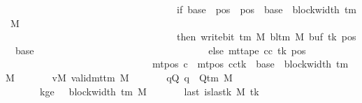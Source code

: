 \begin{isabellebody}
\ \ \ \ \ \ \ \ \ \ \ \ \ \ \ \ \ \ \ \ \ \ \ \ \ \ \ \ \ \ \ \ \ \ \ if\ base{\isacharprime}{\kern0pt}\ {\isasymle}\ pos\ {\isasymand}\ pos\ {\isacharless}{\kern0pt}\ base{\isacharprime}{\kern0pt}\ {\isacharplus}{\kern0pt}\ block{\isacharunderscore}{\kern0pt}width\ {\isacharparenleft}{\kern0pt}{\isasymGamma}{\isacharunderscore}{\kern0pt}tm\ M{\isacharparenright}{\kern0pt}\isanewline
\ \ \ \ \ \ \ \ \ \ \ \ \ \ \ \ \ \ \ \ \ \ \ \ \ \ \ \ \ \ \ \ \ \ \ then\ write{\isacharunderscore}{\kern0pt}bit\ {\isacharparenleft}{\kern0pt}{\isasymGamma}{\isacharunderscore}{\kern0pt}tm\ M{\isacharparenright}{\kern0pt}\ {\isacharparenleft}{\kern0pt}bl{\isacharunderscore}{\kern0pt}tm\ M{\isacharparenright}{\kern0pt}\ {\isacharparenleft}{\kern0pt}buf\ tk{\isacharparenright}{\kern0pt}\ {\isacharparenleft}{\kern0pt}pos\ {\isacharminus}{\kern0pt}\ base{\isacharprime}{\kern0pt}{\isacharparenright}{\kern0pt}\isanewline
\ \ \ \ \ \ \ \ \ \ \ \ \ \ \ \ \ \ \ \ \ \ \ \ \ \ \ \ \ \ \ \ \ \ \ else\ mt{\isacharunderscore}{\kern0pt}tape\ cc\ tk\ pos{\isacharparenright}{\kern0pt}{\isacharparenright}{\kern0pt}\isanewline
\ \ \ \ \ \ \ \ \ \ \ \ \ \ \ \ \ \ \ \ \ \ \ \ \ \ \ \ \ {\isasymand}\ mt{\isacharunderscore}{\kern0pt}pos\ c{\isacharprime}{\kern0pt}{\isacharprime}{\kern0pt}\ {\isacharequal}{\kern0pt}\ {\isacharparenleft}{\kern0pt}mt{\isacharunderscore}{\kern0pt}pos\ cc{\isacharparenright}{\kern0pt}{\isacharparenleft}{\kern0pt}tk\ {\isacharcolon}{\kern0pt}{\isacharequal}{\kern0pt}\ base{\isacharprime}{\kern0pt}\ {\isacharplus}{\kern0pt}\ block{\isacharunderscore}{\kern0pt}width\ {\isacharparenleft}{\kern0pt}{\isasymGamma}{\isacharunderscore}{\kern0pt}tm\ M{\isacharparenright}{\kern0pt}{\isacharparenright}{\kern0pt}{\isachardoublequoteclose}\isanewline
\ \ \ \ \ \ \ vM{\isacharcolon}{\kern0pt}\ {\isachardoublequoteopen}valid{\isacharunderscore}{\kern0pt}mttm\ M{\isachardoublequoteclose}\isanewline
\ \ \ \ \ \ \ qQ{\isacharcolon}{\kern0pt}\ {\isachardoublequoteopen}q\ {\isasymin}\ Q{\isacharunderscore}{\kern0pt}tm\ M{\isachardoublequoteclose}\isanewline
\ \ \ \ \ \ \ kge{}{\isacharcolon}{\kern0pt}\ {\isachardoublequoteopen}{}\ {\isasymle}\ block{\isacharunderscore}{\kern0pt}width\ {\isacharparenleft}{\kern0pt}{\isasymGamma}{\isacharunderscore}{\kern0pt}tm\ M{\isacharparenright}{\kern0pt}{\isachardoublequoteclose}\isanewline
\ \ \ \ \ \ \ last{\isacharcolon}{\kern0pt}\ {\isachardoublequoteopen}is{\isacharunderscore}{\kern0pt}last{\isacharunderscore}{\kern0pt}k\ M\ tk{\isachardoublequoteclose}\isanewline

\end{isabellebody}

